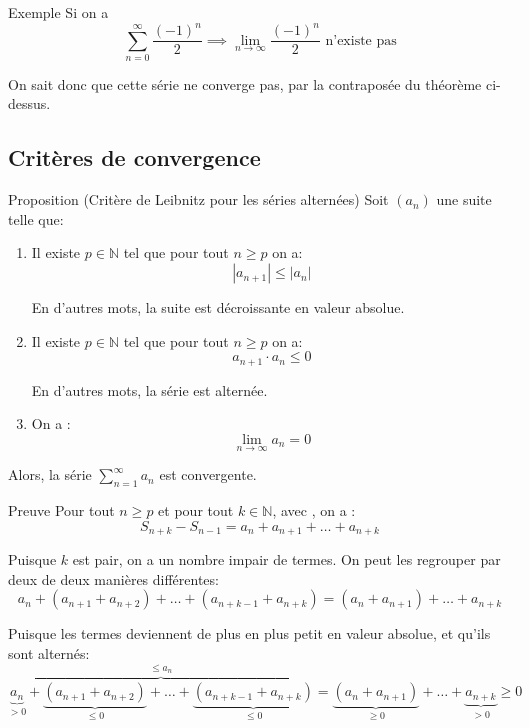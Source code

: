 \documentclass[a4paper]{article}
\begin{document}
\begin{parag}{Exemple}
    Si on a
    \[\sum_{n=0}^{\infty} \frac{\left(-1\right)^{n}}{2} \implies \lim_{n \to \infty} \frac{\left(-1\right)^{n}}{2} \text{ n'existe pas}\]

    On sait donc que cette série ne converge pas, par la contraposée du théorème ci-dessus.

\end{parag}

\subsection{Critères de convergence}

\begin{parag}{Proposition (Critère de Leibnitz pour les séries alternées)}
    Soit $\left(a_n\right)$ une suite telle que:
    \begin{enumerate}
        \item Il existe $p \in \mathbb{N}$ tel que pour tout $n \geq p$ on a:
            \[\left|a_{n+1}\right| \leq \left|a_n\right|\]

            En d'autres mots, la suite est décroissante en valeur absolue.
        \item Il existe $p \in \mathbb{N}$ tel que pour tout $n \geq p$ on a:
            \[a_{n+1}\cdot a_n \leq 0\]

            En d'autres mots, la série est alternée.
        \item On a :
            \[\lim_{n \to \infty} a_n = 0\]

    \end{enumerate}

    Alors, la série $\sum_{n=1}^{\infty} a_n$ est convergente.


    \begin{subparag}{Preuve}
        Pour tout $n \geq p$ et pour tout $k \in \mathbb{N}$, avec , on a :
        \[S_{n+k} - S_{n-1} = a_n + a_{n+1} + \ldots + a_{n+k}\]

        Puisque $k$ est pair, on a un nombre impair de termes. On peut les regrouper par deux de deux manières différentes:
        \[a_n + \left(a_{n+1} + a_{n+2}\right) + \ldots + \left(a_{n + k -1} + a_{n + k}\right) = \left(a_{n} + a_{n+1}\right) + \ldots + a_{n+k}\]


         Puisque les termes deviennent de plus en plus petit en valeur absolue, et qu'ils sont alternés:
        \[\overbrace{\underbrace{a_n}_{> 0} + \underbrace{\left(a_{n+1} + a_{n+2}\right)}_{\leq 0} + \ldots + \underbrace{\left(a_{n + k -1} + a_{n + k}\right)}_{\leq 0}}^{\leq a_n} = \underbrace{\left(a_{n} + a_{n+1}\right)}_{\geq 0} + \ldots + \underbrace{a_{n+k}}_{> 0} \geq 0\]


\end{subparag}
\end{parag}
\end{document}
